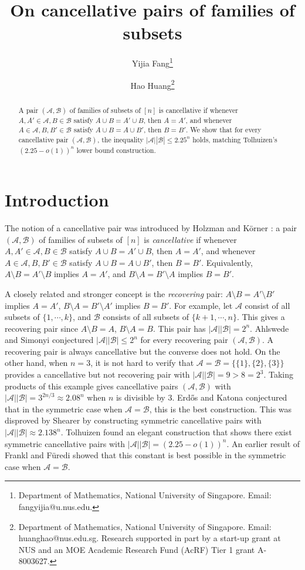 \documentclass{article}
\title{On cancellative pairs of families of subsets}
\date{}
\author{ Yijia Fang\thanks{Department of Mathematics, National University of Singapore. Email: fangyijia@u.nus.edu.}
\and
Hao Huang\thanks{Department of Mathematics, National University of Singapore. Email: huanghao@nus.edu.sg. Research supported in part by a start-up grant at NUS and an MOE Academic Research Fund (AcRF) Tier 1 grant A-8003627.}}
\begin{document}
\maketitle

\begin{abstract}
A pair $(\mathcal{A}, \mathcal{B})$ of families of subsets of $[n]$ is cancellative if whenever $A, A' \in \mathcal{A}, B \in \mathcal{B}$ satisfy $A \cup B=A' \cup B$, then $A=A'$, and whenever $A \in \mathcal{A}, B, B' \in \mathcal{B}$ satisfy $A \cup B=A \cup B'$, then $B=B'$. We show that for every cancellative pair $(\mathcal{A}, \mathcal{B})$, the inequality $|\mathcal{A}||\mathcal{B}| \le 2.25^n$ holds, matching Tolhuizen's $(2.25-o(1))^n$ lower bound construction. 


\end{abstract}

\section{Introduction}
The notion of a cancellative pair was introduced by Holzman and K\"orner \cite{HK95}: a pair $(\mathcal{A}, \mathcal{B})$ of families of subsets of $[n]$ is \textit{cancellative} if whenever $A, A' \in \mathcal{A}, B \in \mathcal{B}$ satisfy $A \cup B=A' \cup B$, then $A=A'$, and whenever $A \in \mathcal{A}, B, B' \in \mathcal{B}$ satisfy $A \cup B=A \cup B'$, then $B=B'$. Equivalently, $A \setminus B=A' \setminus B$ implies $A=A'$, and $B \setminus A=B' \setminus A$ implies $B=B'$.

A closely related and stronger concept is the \textit{recovering} pair: $A \setminus B=A'\setminus B'$ implies $A=A'$, $B \setminus A=B' \setminus A'$ implies $B=B'$.  For example, let $\mathcal{A}$ consist of all subsets of $\{1, \cdots, k\}$, and $\mathcal{B}$ consists of all subsets of $\{k+1, \cdots, n\}$. This gives a recovering  pair since $A \setminus B=A$, $B \setminus A=B$. This pair has $|\mathcal{A}||\mathcal{B}|=2^n$. Ahlswede and Simonyi \cite{AS94} conjectured $|\mathcal{A}||\mathcal{B}| \le 2^n$ for every recovering pair $(\mathcal{A}, \mathcal{B})$. A recovering pair is always cancellative but the converse does not hold. On the other hand, when $n=3$, it is not hard to verify that $\mathcal{A}=\mathcal{B}=\{\{1\},\{2\},\{3\}\}$ provides a cancellative but not recovering pair with $|\mathcal{A}||\mathcal{B}|=9>8=2^3$. Taking products of this example gives cancellative pairs $(\mathcal{A}, \mathcal{B})$ with $|\mathcal{A}||\mathcal{B}|=3^{2n/3} \approx 2.08^n$ when $n$ is divisible by $3$. Erd\H os and Katona \cite{Katona74} conjectured that in the symmetric case when $\mathcal{A}=\mathcal{B}$, this is the best construction. This was disproved by Shearer \cite{Shearer96} by constructing symmetric cancellative pairs with $|\mathcal{A}||\mathcal{B}| \approx 2.138^n$. Tolhuizen \cite{Tol2000} found an elegant construction that shows there exist symmetric cancellative pairs with $|\mathcal{A}||\mathcal{B}| = (2.25-o(1))^n$. An earlier result of Frankl and F\"uredi \cite{FF84} showed that this constant is best possible in the symmetric case when $\mathcal{A}=\mathcal{B}$.
\end{document}

